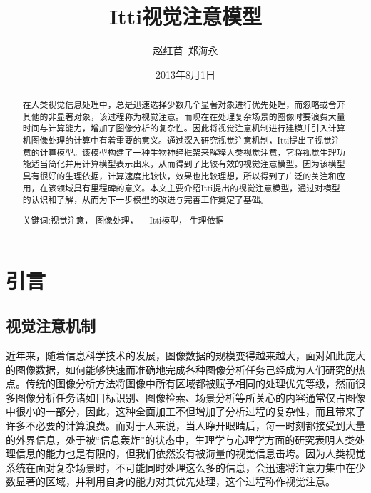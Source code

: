 \documentclass[a4paper,12pt]{article}
\title{Itti视觉注意模型}
\author{赵红苗\  郑海永}
\date{2013年8月1日}
\begin{document}
\maketitle

\begin{abstract} 

在人类视觉信息处理中，总是迅速选择少数几个显著对象进行优先处理，而忽略或舍弃其他的非显著对象，该过程称为视觉注意。而现在在处理复杂场景的图像时要浪费大量时间与计算能力，增加了图像分析的复杂性。因此将视觉注意机制进行建模并引入计算机图像处理的计算中有着重要的意义。通过深入研究视觉注意机制，Itti提出了视觉注意的计算模型。该模型构建了一种生物神经框架来解释人类视觉注意，它将视觉生理功能适当简化并用计算模型表示出来，从而得到了比较有效的视觉注意模型。因为该模型具有很好的生理依据，计算速度比较快，效果也比较理想，所以得到了广泛的关注和应用，在该领域具有里程碑的意义。本文主要介绍Itti提出的视觉注意模型，通过对模型的认识和了解，从而为下一步模型的改进与完善工作奠定了基础。


\begin{description}
\item[关键词:视觉注意，  图像处理，  　Itti模型，  生理依据]
\end{description}

\end{abstract}
\newpage
\tableofcontents 
\newpage

\section{引言}
\subsection{视觉注意机制}

近年来，随着信息科学技术的发展，图像数据的规模变得越来越大，面对如此庞大的图像数据，如何能够快速而准确地完成各种图像分析任务己经成为人们研究的热点。传统的图像分析方法将图像中所有区域都被赋予相同的处理优先等级，然而很多图像分析任务诸如目标识别、图像检索、场景分析等所关心的内容通常仅占图像中很小的一部分，因此，这种全面加工不但增加了分析过程的复杂性，而且带来了许多不必要的计算浪费。而对于人来说，当人睁开眼睛后，每一时刻都接受到大量的外界信息，处于被“信息轰炸”的状态中，生理学与心理学方面的研究表明人类处理信息的能力也是有限的，但我们依然没有被海量的视觉信息击垮。因为人类视觉系统在面对复杂场景时，不可能同时处理这么多的信息，会迅速将注意力集中在少数显著的区域，并利用自身的能力对其优先处理，这个过程称作视觉注意。
\end{document}
